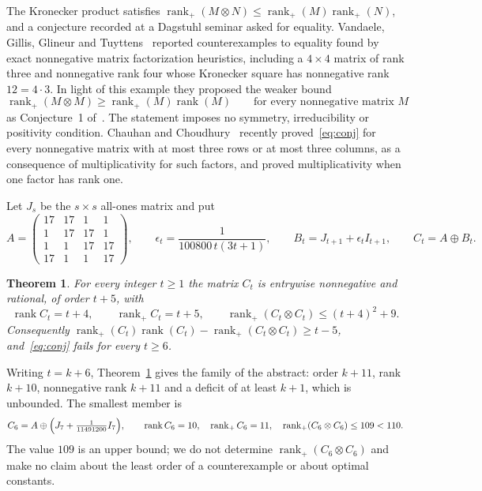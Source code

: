 \documentclass[11pt]{article}
\newtheorem{theorem}{Theorem}
\theoremstyle{remark}
\newcommand{\rk}{\operatorname{rank}}
\newcommand{\rp}{\operatorname{rank}_+}
\begin{document}
The Kronecker product satisfies $\rp(M\otimes N)\le\rp(M)\rp(N)$, and a conjecture recorded at a Dagstuhl seminar asked for equality. Vandaele, Gillis, Glineur and Tuyttens~\cite{VGGT} reported counterexamples to equality found by exact nonnegative matrix factorization heuristics, including a $4\times4$ matrix of rank three and nonnegative rank four whose Kronecker square has nonnegative rank $12=4\cdot3$. In light of this example they proposed the weaker bound
\begin{equation}\label{eq:conj}
\rp(M\otimes M)\ge\rp(M)\rk(M)\qquad\text{for every nonnegative matrix }M
\end{equation}
as Conjecture~1 of~\cite[\S6.1]{VGGT}. The statement imposes no symmetry, irreducibility or positivity condition. Chauhan and Choudhury~\cite{CC} recently proved~\eqref{eq:conj} for every nonnegative matrix with at most three rows or at most three columns, as a consequence of multiplicativity for such factors, and proved multiplicativity when one factor has rank one.

Let $J_s$ be the $s\times s$ all-ones matrix and put
\begin{equation}\label{eq:witness}
A=\begin{pmatrix}17&17&1&1\\1&17&17&1\\1&1&17&17\\17&1&1&17\end{pmatrix},\qquad
\epsilon_t=\frac{1}{100800\,t(3t+1)},\qquad B_t=J_{t+1}+\epsilon_tI_{t+1},\qquad C_t=A\oplus B_t.
\end{equation}

\begin{theorem}\label{thm:main}
For every integer $t\ge1$ the matrix $C_t$ is entrywise nonnegative and rational, of order $t+5$, with
\[
\rk C_t=t+4,\qquad \rp C_t=t+5,\qquad \rp(C_t\otimes C_t)\le(t+4)^2+9 .
\]
Consequently $\rp(C_t)\rk(C_t)-\rp(C_t\otimes C_t)\ge t-5$, and~\eqref{eq:conj} fails for every $t\ge6$.
\end{theorem}

Writing $t=k+6$, Theorem~\ref{thm:main} gives the family of the abstract: order $k+11$, rank $k+10$, nonnegative rank $k+11$ and a deficit of at least $k+1$, which is unbounded. The smallest member is
\[
C_6=A\oplus\Bigl(J_7+\tfrac{1}{11491200}I_7\Bigr),\qquad \rk C_6=10,\quad \rp C_6=11,\quad \rp(C_6\otimes C_6)\le109<110 .
\]
The value $109$ is an upper bound; we do not determine $\rp(C_6\otimes C_6)$ and make no claim about the least order of a counterexample or about optimal constants.
\end{document}
